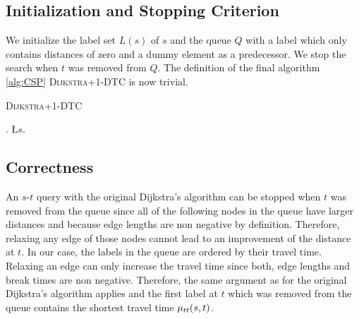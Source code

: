 \subsection{Initialization and Stopping Criterion}
We initialize the label set $L(s)$ of $s$ and the queue $Q$ with a label which only contains distances of zero and a dummy element as a predecessor. We stop the search when $t$ was removed from $Q$. The definition of the final algorithm \ref{alg:CSP} \textsc{Dijkstra+1-DTC} is now trivial.

\begin{algorithm}[bt]
	\caption{\textsc{Dijkstra+1-DTC}}\label{alg:CSP}

	\DontPrintSemicolon %



	\BlankLine
	\Q.\;
	\L{$s$}.\;
	\BlankLine
	{
		\settleNextNode{}\;

		{
			\Return\;
		}
	}
\end{algorithm}

\subsection{Correctness\label{sec:dijkstra_csp_correctness}}
An $s$-$t$ query with the original Dijkstra's algorithm can be stopped when $t$ was removed from the queue since all of the following nodes in the queue have larger distances and because edge lengths are non negative by definition. Therefore, relaxing any edge of those nodes cannot lead to an improvement of the distance at $t$.
In our case, the labels in the queue are ordered by their travel time. Relaxing an edge can only increase the travel time since both, edge lengths and break times are non negative. Therefore, the same argument as for the original Dijkstra's algorithm applies and the first label at $t$ which was removed from the queue contains the shortest travel time $\mu_{tt}(s,t)$.

